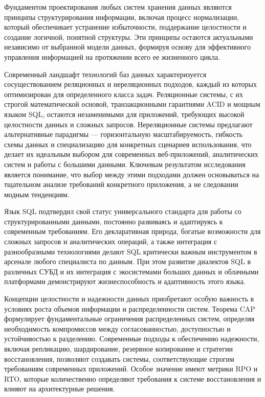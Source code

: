 \documentclass{SibFU-docs}
\begin{document}
Фундаментом проектирования любых систем хранения данных являются принципы структурирования информации, включая процесс нормализации, который обеспечивает устранение избыточности, поддержание целостности и создание логичной, понятной структуры. Эти принципы остаются актуальными независимо от выбранной модели данных, формируя основу для эффективного управления информацией на протяжении всего ее жизненного цикла.

Современный ландшафт технологий баз данных характеризуется сосуществованием реляционных и нереляционных подходов, каждый из которых оптимизирован для определенного класса задач. Реляционные системы, с их строгой математической основой, транзакционными гарантиями ACID и мощным языком SQL, остаются незаменимыми для приложений, требующих высокой целостности данных и сложных запросов. Нереляционные системы предлагают альтернативные парадигмы — горизонтальную масштабируемость, гибкость схемы данных и специализацию для конкретных сценариев использования, что делает их идеальным выбором для современных веб-приложений, аналитических систем и работы с большими данными. Ключевым результатом исследования является понимание, что выбор между этими подходами должен основываться на тщательном анализе требований конкретного приложения, а не следовании модным тенденциям.

Язык SQL подтвердил свой статус универсального стандарта для работы со структурированными данными, постоянно развиваясь и адаптируясь к современным требованиям. Его декларативная природа, богатые возможности для сложных запросов и аналитических операций, а также интеграция с разнообразными технологиями делают SQL критически важным инструментом в арсенале любого специалиста по данным. При этом развитие диалектов SQL в различных СУБД и их интеграция с экосистемами больших данных и облачными платформами демонстрируют жизнеспособность и адаптивность этого языка.

Концепции целостности и надежности данных приобретают особую важность в условиях роста объемов информации и распределенности систем. Теорема CAP формулирует фундаментальные ограничения распределенных систем, определяя необходимость компромиссов между согласованностью, доступностью и устойчивостью к разделению. Современные подходы к обеспечению надежности, включая репликацию, шардирование, резервное копирование и стратегии восстановления, позволяют создавать системы, соответствующие строгим требованиям современных приложений. Особое значение имеют метрики RPO и RTO, которые количественно определяют требования к системе восстановления и влияют на архитектурные решения.
\end{document}
